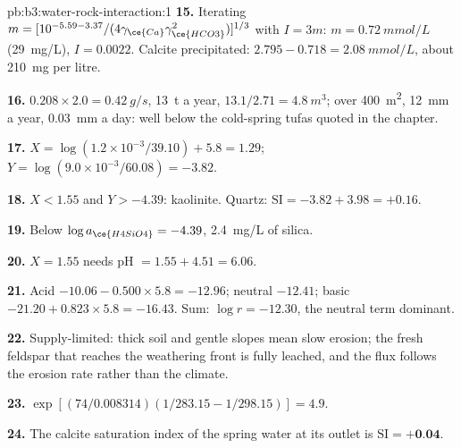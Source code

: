 \begin{solution}{pb:b3:water-rock-interaction:1}
\textbf{15.} Iterating $m = [10^{-5.59 - 3.37}/(4\gamma_{\ce{Ca}}
\gamma_{\ce{HCO3}}^2)]^{1/3}$ with $I = 3m$: $m = \qty{0.72}{mmol/L}$
(\qty{29}{mg/L}), $I = 0.0022$. Calcite precipitated: $2.795 - 0.718 =
\qty{2.08}{mmol/L}$, about \qty{210}{mg} per litre.

\textbf{16.} $0.208\times2.0 = \qty{0.42}{g/s}$, \qty{13}{t} a year,
$13.1/2.71 = \qty{4.8}{m^3}$; over \qty{400}{m^2}, \qty{12}{mm} a year,
\qty{0.03}{mm} a day: well below the cold-spring tufas quoted in the chapter.

\textbf{17.} $X = \log(1.2\times10^{-3}/39.10) + 5.8 = 1.29$; $Y =
\log(9.0\times10^{-3}/60.08) = -3.82$.

\textbf{18.} $X < 1.55$ and $Y > -4.39$: kaolinite. Quartz: $\mathrm{SI} =
-3.82 + 3.98 = +0.16$.

\textbf{19.} Below $\log a_{\ce{H4SiO4}} = -4.39$, \qty{2.4}{mg/L} of
silica.

\textbf{20.} $X = 1.55$ needs pH $= 1.55 + 4.51 = 6.06$.

\textbf{21.} Acid $-10.06 - 0.500\times5.8 = -12.96$; neutral $-12.41$; basic
$-21.20 + 0.823\times5.8 = -16.43$. Sum: $\log r = -12.30$, the neutral term
dominant.

\textbf{22.} Supply-limited: thick soil and gentle slopes mean slow erosion;
the fresh feldspar that reaches the weathering front is fully leached, and
the flux follows the erosion rate rather than the climate.

\textbf{23.} $\exp[(74/0.008314)(1/283.15 - 1/298.15)] = 4.9$.

\textbf{24.} The calcite saturation index of the spring water at its outlet
is $\mathrm{SI} = \textbf{+0.04}$.
\end{solution}
